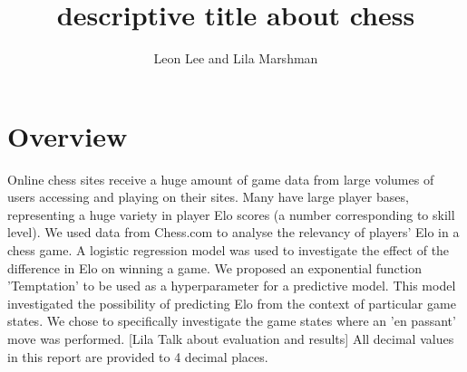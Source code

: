 \documentclass[10pt,a4paper]{article}
\title{descriptive title about chess}
\author{Leon Lee and Lila Marshman}
\begin{document}
\maketitle

\section{Overview}
Online chess sites receive a huge amount of game data from large volumes of users accessing and playing on their sites. Many have large player bases, representing a huge variety in player Elo scores (a number corresponding to skill level). We used data from Chess.com to analyse the relevancy of players' Elo in a chess game. A logistic regression model was used to investigate the effect of the difference in Elo on winning a game. We proposed an exponential function 'Temptation' to be used as a hyperparameter for a predictive model. This model investigated the possibility of predicting Elo from the context of particular game states. We chose to specifically investigate the game states where an 'en passant' move was performed. [Lila Talk about evaluation and results]\newline
All decimal values in this report are provided to 4 decimal places.
\end{document}
